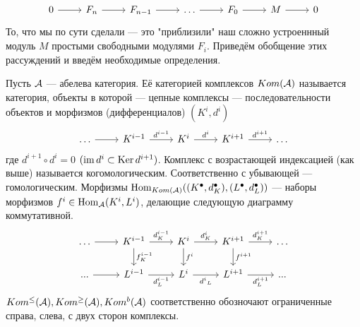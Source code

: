 \documentclass[../main.tex]{subfiles}
\begin{document}
\begin{equation}\label{free_res_hilb}
    \begin{tikzcd}
	0 & {F_{n}} & {F_{n-1}} & \ldots & {F_0} & M & 0
	\arrow[from=1-1, to=1-2]
	\arrow[from=1-2, to=1-3]
	\arrow[from=1-3, to=1-4]
	\arrow[from=1-4, to=1-5]
	\arrow[from=1-5, to=1-6]
	\arrow[from=1-6, to=1-7]
\end{tikzcd}
\end{equation}
То, что мы по сути сделали --- это "приблизили" наш сложно устроеннный модуль $M$ простыми свободными модулями $F_i$.
Приведём обобщение этих рассуждений и введём необходимые определения.
\begin{to_def}\label{complex}
Пусть $\mathcal{A}$ --- абелева категория. Её категорией комплексов $Kom(\mathcal{A})$ называется категория, объекты в которой --- цепные комплексы --- последовательности объектов и морфизмов (дифференциалов) $(K^i, d^i)$
\begin{equation*}
    \begin{tikzcd}
	\ldots & {K^{i-1}} & {K^i} & {K^{i+1}} & \ldots
	\arrow[from=1-1, to=1-2]
	\arrow["{d^{i-1}}", from=1-2, to=1-3]
	\arrow["{d^i}", from=1-3, to=1-4]
	\arrow["{d^{i+1}}", from=1-4, to=1-5]
\end{tikzcd}
\end{equation*}
где $d^{i+1}\circ d^{i} = 0$ $(\mathop{\mathrm{im}}\nolimits d^i \subset \mathop{\mathrm{Ker}}\nolimits d^{i+1})$. Комплекс с возрастающей индексацией (как выше) называется когомологическим. Соответственно с убывающей --- гомологическим. Морфизмы $\operatorname{Hom}_{Kom(\mathcal{A})}((K^\bullet, d^\bullet_K), (L^\bullet, d^\bullet_L))$ --- наборы морфизмов $f^i \in \operatorname{Hom}_{\mathcal{A}}(K^i, L^i)$, делающие следующую диаграмму коммутативной.
\begin{equation}\label{komplex_morphisms}
\begin{tikzcd}
	\ldots & {K^{i-1}} & {K^i} & {K^{i+1}} & \ldots \\
	{...} & {L^{i-1}} & {L^i} & {L^{i+1}} & {...}
	\arrow[from=1-1, to=1-2]
	\arrow["{d^{i-1}_K}", from=1-2, to=1-3]
	\arrow["{d^i_K}", from=1-3, to=1-4]
	\arrow["{d^{i+1}_K}", from=1-4, to=1-5]
	\arrow["{f^{i-1}_K}", from=1-2, to=2-2]
	\arrow[from=2-1, to=2-2]
	\arrow["{d^{i-1}_L}"', from=2-2, to=2-3]
	\arrow["{d^i}_L"', from=2-3, to=2-4]
	\arrow["{d^{i+1}_L}"', from=2-4, to=2-5]
	\arrow["{f^{i}}", from=1-3, to=2-3]
	\arrow["{f^{i+1}}", from=1-4, to=2-4]
\end{tikzcd}
\end{equation}
$Kom^\le(\mathcal{A}), Kom^\ge(\mathcal{A}), Kom^b(\mathcal{A})$ соответственно обозночают ограниченные справа, слева, с двух сторон комплексы.
\end{to_def}
\end{document}
